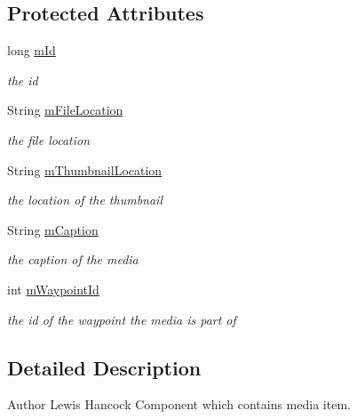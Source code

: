 \subsection*{Protected Attributes}
\begin{DoxyCompactItemize}
\item 
long \hyperlink{classuk_1_1ac_1_1swan_1_1digitaltrails_1_1components_1_1_media_a917af7834f1c738f7db4b9c4aa63c591}{m\+Id}
\begin{DoxyCompactList}\small\item\em the id \end{DoxyCompactList}\item 
String \hyperlink{classuk_1_1ac_1_1swan_1_1digitaltrails_1_1components_1_1_media_adca9e1c69acc1e40cbc0903bb647dbf7}{m\+File\+Location}
\begin{DoxyCompactList}\small\item\em the file location \end{DoxyCompactList}\item 
String \hyperlink{classuk_1_1ac_1_1swan_1_1digitaltrails_1_1components_1_1_media_a50f6550300077e923c98c13bc892a14f}{m\+Thumbnail\+Location}
\begin{DoxyCompactList}\small\item\em the location of the thumbnail \end{DoxyCompactList}\item 
String \hyperlink{classuk_1_1ac_1_1swan_1_1digitaltrails_1_1components_1_1_media_a06f8429d27ef6eb5d90b60d38abb9e7e}{m\+Caption}
\begin{DoxyCompactList}\small\item\em the caption of the media \end{DoxyCompactList}\item 
int \hyperlink{classuk_1_1ac_1_1swan_1_1digitaltrails_1_1components_1_1_media_a4c8b01f28e5c33695b745849f3c72dc4}{m\+Waypoint\+Id}
\begin{DoxyCompactList}\small\item\em the id of the waypoint the media is part of \end{DoxyCompactList}\end{DoxyCompactItemize}


\subsection{Detailed Description}
\begin{DoxyAuthor}{Author}
Lewis Hancock Component which contains media item. 
\end{DoxyAuthor}


